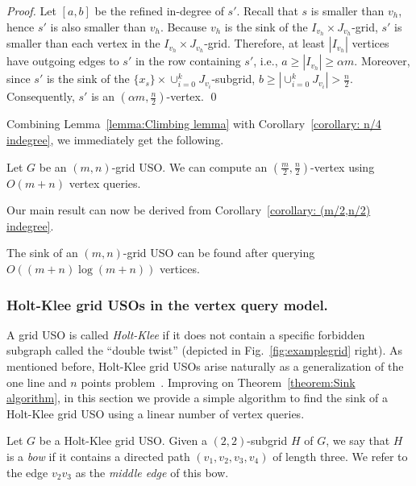 \documentclass[runningheads,a4paper]{llncs}
\newcommand{\indegree}{refined in-degree\xspace}
\begin{document}
\begin{proof}
Let $[a,b]$ be the \indegree of $s'$.
Recall that $s$ is smaller than $v_h$, hence $s'$ is also smaller than $v_h$.
Because $v_h$ is the sink of the $I_{v_h}\times J_{v_h}$-grid, $s'$ is smaller than each vertex in the $I_{v_h}\times J_{v_h}$-grid.
Therefore, at least $|I_{v_h}|$ vertices have outgoing edges to $s'$ in the row containing $s'$, i.e., $a\geq |I_{v_h}| \geq \alpha m$.
Moreover, since $s'$ is the sink of the $\{x_s\}\times \cup_{i=0}^k J_{v_i}$-subgrid, $b \geq |\cup_{i=0}^k J_{v_i}|  >  \frac{n}{2}$.
Consequently, $s'$ is an $(\alpha m,  \frac{n}{2})$-vertex. \qed
\end{proof}

Combining Lemma~\ref{lemma:Climbing lemma}  with Corollary~\ref{corollary: n/4 indegree}, we immediately get the following.
\begin{corollary}[$*$]\label{corollary: (m/2,n/2) indegree}
Let $G$ be an $(m,n)$-grid USO. 
We can compute an $( \frac{m}{2}, \frac{n}{2})$-vertex using $O(m + n)$ vertex queries.
\end{corollary}

Our main result can now be derived from Corollary~\ref{corollary: (m/2,n/2) indegree}.

\begin{theorem}[$*$]\label{theorem:Sink algorithm}
The sink of an $(m,n)$-grid USO can be found after querying $O((m+n)\log (m+n))$ vertices.
\end{theorem}



\subsubsection{Holt-Klee grid USOs in the vertex query model.}
\label{section:Holt-Klee vertex query}

A grid USO is called \emph{Holt-Klee} if it does not contain a specific forbidden subgraph called the ``double twist'' (depicted in Fig.~\ref{fig:examplegrid} right).
As mentioned before, Holt-Klee grid USOs arise naturally as a generalization of the one line and $n$ points problem~\cite{linepoint}.
Improving on Theorem~\ref{theorem:Sink algorithm},
in this section we provide a simple algorithm to find the sink of a Holt-Klee grid USO using a linear number of vertex queries. 

Let $G$ be a Holt-Klee grid USO.
Given a $(2,2)$-subgrid $H$ of $G$, we say that $H$ is a \emph{bow} if it contains a directed path $(v_1, v_2, v_3, v_4)$ of length three. We refer to the edge $v_2 v_3$ as the \emph{middle edge} of this bow.
\end{document}
